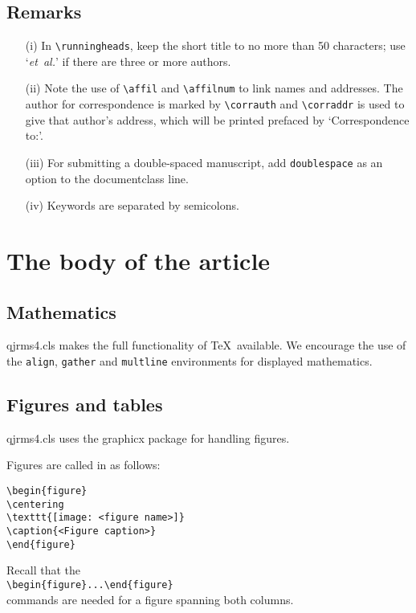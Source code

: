 \documentclass[times]{qjrms4}
\begin{document}
\subsection{Remarks}
\begin{enumerate}
\item[(i)] In \verb"\runningheads", keep the short title to no
more than 50 characters; use `\emph{et~al.}' if there are three or
more authors.

\item[(ii)] Note the use of \verb"\affil" and \verb"\affilnum" to
link names and addresses. The author for correspondence is marked
by \verb"\corrauth" and \verb"\corraddr" is used to give that
author's address, which will be printed prefaced by
`Correspondence to:'.

\item[(iii)] For submitting a double-spaced manuscript, add
\verb"doublespace" as an option to the documentclass line.

\item[(iv)] Keywords are separated by semicolons.
\end{enumerate}

\section{The body of the article}

\subsection{Mathematics} \textsf{qjrms4.cls} makes the full
functionality of \AmS\/\TeX\ available. We encourage the use of
the \verb"align", \verb"gather" and \verb"multline" environments
for displayed mathematics.

\subsection{Figures and tables} \textsf{qjrms4.cls} uses the
\textsf{graphicx} package for handling figures.

Figures are called in as follows:
\begin{verbatim}
\begin{figure}
\centering
\texttt{[image: <figure name>]}
\caption{<Figure caption>}
\end{figure}
\end{verbatim}
Recall that the\\
\verb"\begin{figure*}...\end{figure*}"\\
commands are needed for a
figure spanning both columns.
\end{document}
